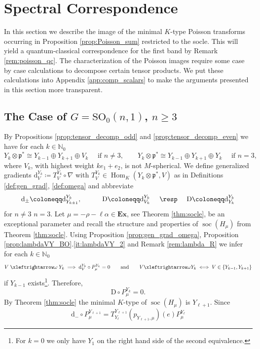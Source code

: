 \documentclass[JEP,XML,SOM,NoFloatCountersInSection,Unicode,published]{cedram}
\theoremstyle{definition}
\newcommand{\lraomega}{\ensuremath{\xleftrightarrow\omega}}
\newcommand{\notleftrightomega}{\mathrel{\ooalign{$\xleftrightarrow\omega$\cr\hidewidth$/$\hidewidth}}}
\newcommand{\mf}[1]{\ensuremath{\mathfrak{#1}}}
\newcommand{\on}[1]{\ensuremath{\operatorname{#1}}}
\newcommand{\Hom}[3]{\ensuremath{\on{Hom}_{#1}(#2,#3)}}
\newcommand{\rhoa}{\ensuremath{\rho}}
\newcommand{\N}{\ensuremath{\mathbb{N}}}
\newcommand{\pst}[1]{\ensuremath{H_{#1}}}
\newcommand{\GSO}[1]{\ensuremath{\mathrm{SO}_0(#1,1)}}
\begin{document}
\section{Spectral Correspondence}\label{sec:spec_corres}
In this section we describe the image of the minimal $K$-type Poisson transforms occur\-ring in Proposition \ref{prop:Poisson_sum} restricted to the socle. This will yield a quantum-classical correspondence for the first band by Remark \ref{rem:poisson_qc}. The characterization of the Poisson images require some case by case calculations to decompose certain tensor products. We put these calculations into Appendix \ref{app:comp_scalars} to make the arguments presented in this section more transparent.

\subsection{\texorpdfstring{The Case of $G=\GSO{n}$, $n\geq 3$}{The Case of G=SO(n,1), n>=3}}
By Propositions \ref{prop:tensor_decomp_odd} and \ref{prop:tensor_decomp_even} we have for each $k\in\N_0$
\[
Y_k\otimes\mf p^*\cong Y_{k-1}\oplus Y_{k+1}\oplus V_k\quad\text{ if }n\neq3, \qquad Y_k\otimes\mf p^*\cong Y_{k-1}\oplus Y_{k+1}\oplus Y_k\quad\text{ if }n=3,
\]
where $V_k$, with highest weight $ke_1+e_2$, is not $M$-spherical. We define generalized gradients $\mathrm{d}_V^{Y_k}\coloneqq T_V^{Y_k}\circ\nabla$ with $T_V^{Y_k}\in\Hom{K}{Y_k\otimes\mf p^*}{V}$ as in Definitions \ref{def:gen_grad}, \ref{def:omega} and abbreviate
\[
\mathrm{d}_\pm\coloneqq\mathrm{d}_{Y_{k\pm1}}^{Y_k},\qquad\quad\mathrm{D}\coloneqq\mathrm{d}_{V_k}^{Y_k}\quad\text{ \resp }\quad\mathrm{D}\coloneqq\mathrm{d}_{Y_k}^{Y_k}
\]
for $n\neq 3$ \resp $n=3$. Let $\mu=-\rhoa-\ell\alpha\in\mathbf{Ex}$, see Theorem \ref{thm:socle}, be an exceptional parameter and recall the structure and properties of $\on{soc}(\pst{\mu})$ from Theorem \ref{thm:socle}. Using Proposition \ref{prop:gen_grad_omega}, Proposition \ref{prop:lambdaVY_BO}.\ref{it:lambdaVY_2} and Remark \ref{rem:lambda_R} we infer for each $k\in\N_0$
\[
V\notleftrightomega Y_k\implies \mathrm{d}_V^{Y_k}\circ P_\mu^{Y_k}=0\qquad\text{and}\qquad V\lraomega Y_k\iff V\in\{Y_{k-1}, Y_{k+1}\}
\]
if $Y_{k-1}$ exists\footnote{For $k=0$ we only have $Y_1$ on the right hand side of the second equivalence.}. Therefore,
\[
\mathrm{D}\circ P_\mu^{Y_k}=0.
\]
By Theorem \ref{thm:socle} the minimal $K$-type of $\on{soc}(\pst{\mu})$ is $Y_{\ell+1}$. Since
\[
\mathrm{d}_-\circ P_\mu^{Y_{\ell+1}}=T_{Y_{\ell}}^{Y_{\ell+1}}(p_{Y_{\ell+1},\mu})(e)P_\mu^{Y_{\ell}}
\]
\end{document}
